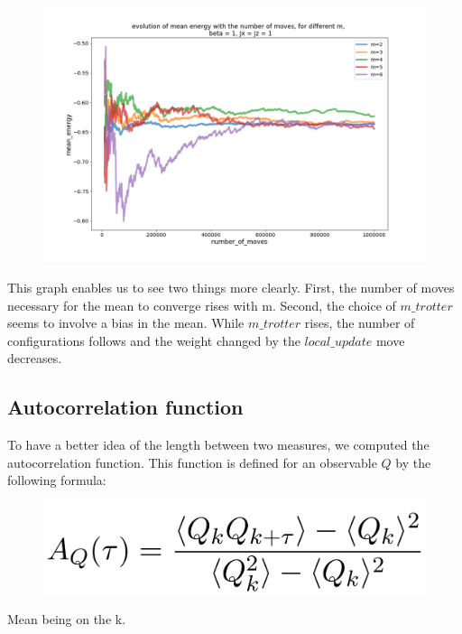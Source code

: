 \documentclass[a4paper,12pt]{article}
\begin{document}
	 \begin{figure}[H]
	 	\centering
	 	\includegraphics[scale=0.4]{mean_energy_evolution_centerd_x=z=1_m2-6.png}
	 	\label{energy mean evolution}			
	 \end{figure}
	 This graph enables us to see two things more clearly.  First, the number of moves necessary for the mean to converge rises with m. Second, the choice of $m\_trotter$ seems to involve a bias in the mean.
	 While $m\_trotter$ rises, the number of configurations follows and the weight changed by the $local\_update$ move decreases.
	 
	 
	 \subsection{Autocorrelation function}
	 To have a better idea of the length between two measures, we computed the autocorrelation function. This function is defined for an observable $Q$ by the following formula:
	\begin{figure}[H]
	 	\centering
	 	\includegraphics[scale=0.25]{autocorformula.png}
	\end{figure}
		
	Mean being on the k.
	
\end{document}
